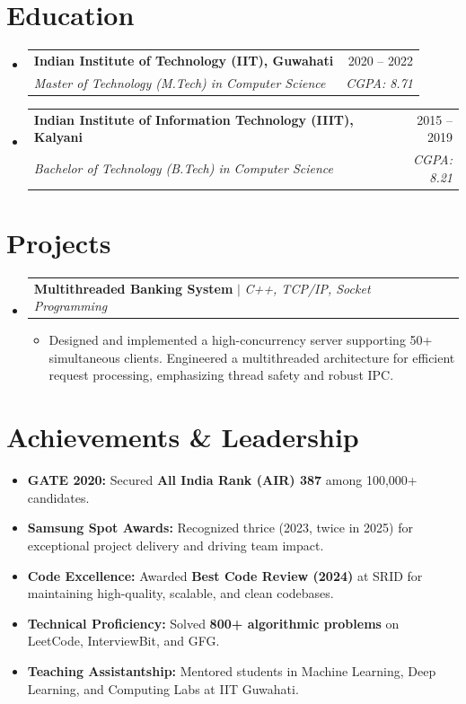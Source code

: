 \documentclass[letterpaper,10 pt]{article}
\makeatletter
\newcommand{\resumeItem}[1]{\item\small{{#1 \vspace{-2pt}}}}
\newcommand{\resumeSubheading}[4]{
  \vspace{-2pt}\item
    \begin{tabular*}{0.97\textwidth}[t]{l@{\extracolsep{\fill}}r}
      \textbf{#1} & #2 \\
      \textit{\small#3} & \textit{\small #4} \\
    \end{tabular*}\vspace{-7pt}
}
\newcommand{\resumeProjectHeading}[2]{
    \item
    \begin{tabular*}{0.97\textwidth}{l@{\extracolsep{\fill}}r}
      \small#1 & #2 \\
    \end{tabular*}\vspace{-7pt}
}
\newcommand{\resumeSubHeadingListStart}{\begin{itemize}[leftmargin=0.15in, label={}]}
\newcommand{\resumeSubHeadingListEnd}{\end{itemize}}
\newcommand{\resumeItemListStart}{\begin{itemize}}
\newcommand{\resumeItemListEnd}{\end{itemize}\vspace{-5pt}}
\makeatother
\begin{document}
\vspace{-16pt}
\section{Education}
\resumeSubHeadingListStart
\resumeSubheading{Indian Institute of Technology (IIT), Guwahati}{2020 -- 2022}{Master of Technology (M.Tech) in Computer Science}{CGPA: 8.71}
\resumeSubheading{Indian Institute of Information Technology (IIIT), Kalyani}{2015 -- 2019}{Bachelor of Technology (B.Tech) in Computer Science}{CGPA: 8.21}
\resumeSubHeadingListEnd

\vspace{-12pt}
\section{Projects}
\resumeSubHeadingListStart
\resumeProjectHeading
{\textbf{Multithreaded Banking System} $|$ \emph{C++, TCP/IP, Socket Programming}}{}
\resumeItemListStart
\resumeItem{Designed and implemented a high-concurrency server supporting 50+ simultaneous clients. Engineered a multithreaded architecture for efficient request processing, emphasizing thread safety and robust IPC.}
\resumeItemListEnd
\resumeSubHeadingListEnd

\vspace{-12pt}
\section{Achievements \& Leadership}
\resumeSubHeadingListStart
\resumeItemListStart
\resumeItem{\textbf{GATE 2020:} Secured \textbf{All India Rank (AIR) 387} among 100,000+ candidates.}
\resumeItem{\textbf{Samsung Spot Awards:} Recognized thrice (2023, twice in 2025) for exceptional project delivery and driving team impact.}
\resumeItem{\textbf{Code Excellence:} Awarded \textbf{Best Code Review (2024)} at SRID for maintaining high-quality, scalable, and clean codebases.}
\resumeItem{\textbf{Technical Proficiency:} Solved \textbf{800+ algorithmic problems} on LeetCode, InterviewBit, and GFG.}
\resumeItem{\textbf{Teaching Assistantship:} Mentored students in Machine Learning, Deep Learning, and Computing Labs at IIT Guwahati.}
\resumeItemListEnd
\resumeSubHeadingListEnd
\end{document}
